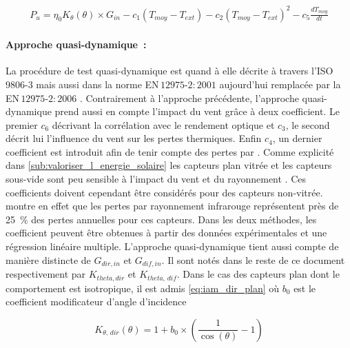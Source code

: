 \begin{equation}\label{eq:instantanee_complete}
    \begin{aligned}
        P_{u} = \eta_{0} K_{\theta}(\theta) \times G_{in} - c_{1} (T_{moy} - T_{ext}) - c_{2} (T_{moy}
                - T_{ext})^{2} - c_{5}\frac{dT_{moy}}{dt}
    \end{aligned}
\end{equation}


\paragraph{Approche quasi-dynamique~:} %
\label{par:approche_quasi_dynamique}
La procédure de test quasi-dynamique est quand à elle décrite à travers l’ISO\,$9806$-$3$
mais aussi dans la norme EN\,$12975$-$2:2001$ \parencite{EN1297522001} aujourd’hui
remplacée par la EN\,$12975$-$2:2006$ \parencite{EN1297522006}.
Contrairement à l’approche précédente, l’approche quasi-dynamique prend aussi en
compte l’impact du vent grâce à deux coefficient. Le premier $c_{6}$ décrivant la
corrélation avec le rendement optique et $c_{3}$, le second décrit lui l’influence
du vent sur les pertes thermiques. Enfin $c_{4}$, un dernier coefficient est introduit afin
de tenir compte des pertes par . Comme explicité dans \ref{sub:valoriser_l_energie_solaire}
les capteurs plan vitrée et les capteurs sous-vide sont peu sensible à l’impact du
vent et du rayonnement . Ces coefficients doivent cependant être considérés
pour des capteurs non-vitrée. \textcite{Hunn197733} montre en effet que les pertes
par rayonnement infrarouge représentent près de \SI{25}{\percent} des pertes annuelles
pour ces capteurs. Dans les deux méthodes, les coefficient peuvent être obtenues à
partir des données expérimentales et une régression linéaire multiple.
L’approche quasi-dynamique tient aussi compte de manière distincte de $G_{dir, in}$ et
$G_{dif, in}$. Il sont notés dans le reste de ce document respectivement par $K_{theta,
dir}$ et $K_{theta,\,dif}$. Dans le cas des capteurs plan dont le comportement est
isotropique, il est admis \eqref{eq:iam_dir_plan} où $b_{0}$ est le coefficient
modificateur d’angle d’incidence \parencite{Zambolin20101382}

\begin{equation}\label{eq:iam_dir_plan}
    K_{\theta,\,dir} (\theta) = 1 + b_{0} \times \left(\frac{1}{\cos(\theta)} - 1\right)
\end{equation}

